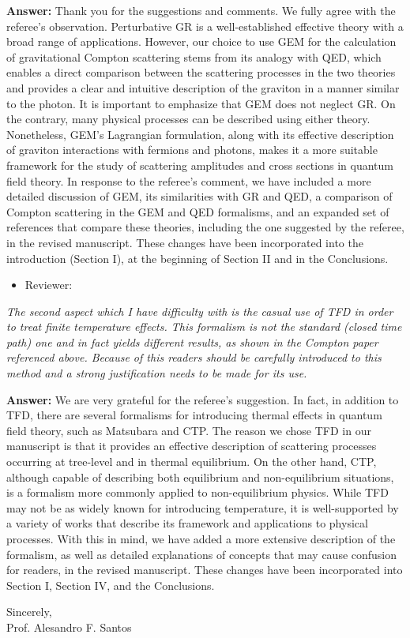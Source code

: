\documentclass[11pt,superscriptaddress,aps,prd,preprint]{revtex4-2}
\begin{document}
{\bf Answer:} Thank you for the suggestions and comments. We fully agree with the referee's observation. Perturbative GR is a well-established effective theory with a broad range of applications. However, our choice to use GEM for the calculation of gravitational Compton scattering stems from its analogy with QED, which enables a direct comparison between the scattering processes in the two theories and provides a clear and intuitive description of the graviton in a manner similar to the photon. It is important to emphasize that GEM does not neglect GR. On the contrary, many physical processes can be described using either theory. Nonetheless, GEM's Lagrangian formulation, along with its effective description of graviton interactions with fermions and photons, makes it a more suitable framework for the study of scattering amplitudes and cross sections in quantum field theory. In response to the referee's comment, we have included a more detailed discussion of GEM, its similarities with GR and QED, a comparison of Compton scattering in the GEM and QED formalisms, and an expanded set of references that compare these theories, including the one suggested by the referee, in the revised manuscript. These changes have been incorporated into the introduction (Section I), at the beginning of Section II and in the Conclusions. 


\vspace{0.3cm}
\begin{itemize}
	\item Reviewer:
\end{itemize}

\vspace{0.3cm}

{\it The second aspect which I have difficulty with is the casual use of TFD in
	order to treat finite temperature effects. This formalism is not the standard
	(closed time path) one and in fact yields different results, as shown in the
	Compton paper referenced above. Because of this readers should be carefully
	introduced to this method and a strong justification needs to be made for its
	use.}

\vspace{0.3cm}

{\bf Answer:} We are very grateful for the referee's suggestion. In fact, in addition to TFD, there are several formalisms for introducing thermal effects in quantum field theory, such as Matsubara and CTP. The reason we chose TFD in our manuscript is that it provides an effective description of scattering processes occurring at tree-level and in thermal equilibrium. On the other hand, CTP, although capable of describing both equilibrium and non-equilibrium situations, is a formalism more commonly applied to non-equilibrium physics. While TFD may not be as widely known for introducing temperature, it is well-supported by a variety of works that describe its framework and applications to physical processes. With this in mind, we have added a more extensive description of the formalism, as well as detailed explanations of concepts that may cause confusion for readers, in the revised manuscript. These changes have been incorporated into Section I, Section IV, and the Conclusions.

\vspace{0.3cm}


\begin{flushleft}
{Sincerely,}\\
\vspace{0.2cm}
Prof. Alesandro F. Santos
\end{flushleft}
\end{document}
